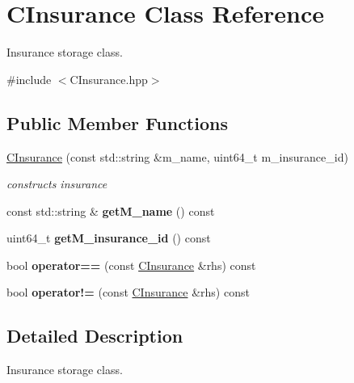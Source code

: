 \hypertarget{classCInsurance}{}\section{C\+Insurance Class Reference}
\label{classCInsurance}


Insurance storage class.  




{\ttfamily \#include $<$C\+Insurance.\+hpp$>$}

\subsection*{Public Member Functions}
\begin{DoxyCompactItemize}
\item 
\hyperlink{classCInsurance_a34e55c388812d75d457eed7cad0a235b}{C\+Insurance} (const std\+::string \&m\+\_\+name, uint64\+\_\+t m\+\_\+insurance\+\_\+id)
\begin{DoxyCompactList}\small\item\em constructs insurance \end{DoxyCompactList}\item 
const std\+::string \& {\bfseries get\+M\+\_\+name} () const \hypertarget{classCInsurance_a712ce7f9f0195e0511e5ccc93457242f}{}\label{classCInsurance_a712ce7f9f0195e0511e5ccc93457242f}

\item 
uint64\+\_\+t {\bfseries get\+M\+\_\+insurance\+\_\+id} () const \hypertarget{classCInsurance_a3788273ee33a489f02739cabcade3207}{}\label{classCInsurance_a3788273ee33a489f02739cabcade3207}

\item 
bool {\bfseries operator==} (const \hyperlink{classCInsurance}{C\+Insurance} \&rhs) const \hypertarget{classCInsurance_a2ed0f188e9cc0d834fe83701283f63c7}{}\label{classCInsurance_a2ed0f188e9cc0d834fe83701283f63c7}

\item 
bool {\bfseries operator!=} (const \hyperlink{classCInsurance}{C\+Insurance} \&rhs) const \hypertarget{classCInsurance_a231f6888c0fc9f5675410ff14ceec287}{}\label{classCInsurance_a231f6888c0fc9f5675410ff14ceec287}

\end{DoxyCompactItemize}


\subsection{Detailed Description}
Insurance storage class. 

